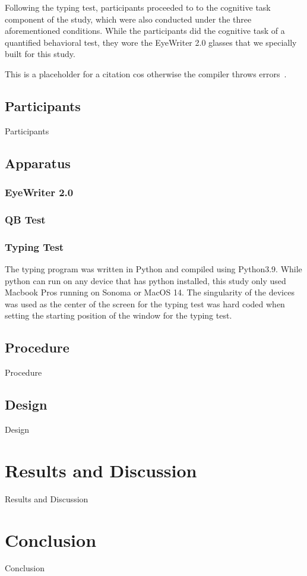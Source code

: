 \documentclass[manuscript, screen, review]{acmart} %
\begin{document}
Following the typing test, participants proceeded to to the cognitive task component of the study, which were also conducted under the three aforementioned conditions. While the participants did the cognitive task of a quantified behavioral test, they wore the EyeWriter 2.0 glasses that we specially built for this study.


This is a placeholder for a citation cos otherwise the compiler throws errors~\cite{AudioDistractionsAshley}.

\subsection[short]{Participants}
Participants

\subsection[short]{Apparatus}

\subsubsection{EyeWriter 2.0}
\subsubsection{QB Test}
\subsubsection{Typing Test}
The typing program was written in Python and compiled using Python3.9. While python can run on any device that has python installed, this study only used Macbook Pros running on Sonoma or MacOS 14. The singularity of the devices was used as the center of the screen for the typing test was hard coded when setting the starting position of the window for the typing test.

\subsection[short]{Procedure}
Procedure

\subsection[short]{Design}
Design

\section{Results and Discussion}
Results and Discussion

\section{Conclusion}
Conclusion



\end{document}
